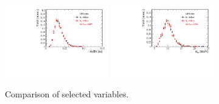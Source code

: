 \begin{figure}[h]
\includegraphics[height=!,width=0.4\textwidth]{figs/dataVsMC/B0vsBs_signal/Ds2all_Bs_DTF_TAUERR.pdf}
\includegraphics[height=!,width=0.4\textwidth]{figs/dataVsMC/B0vsBs_signal/Ds2all_Bs_DTF_MERR.pdf}



\caption{Comparison of selected variables.}
\label{fig:}
\end{figure}

%
%
%
%
%
